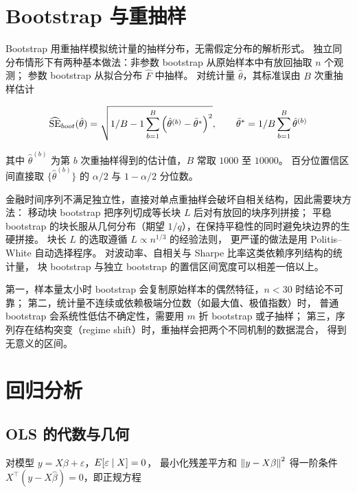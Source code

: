 \section{Bootstrap 与重抽样}

Bootstrap 用重抽样模拟统计量的抽样分布，无需假定分布的解析形式。
独立同分布情形下有两种基本做法：非参数 bootstrap 从原始样本中有放回抽取 $n$ 个观测；
参数 bootstrap 从拟合分布 $\hat{F}$ 中抽样。
对统计量 $\hat{\theta}$，其标准误由 $B$ 次重抽样估计

\begin{equation}
  \widehat{\operatorname{SE}}_{boot}(\hat{\theta}) =
  \sqrt{1/B-1\sum_{b=1}^{B}\left(\hat{\theta}^{(b)} - \bar{\theta}^{*}\right)^{2}},
  \qquad \bar{\theta}^{*} = 1/B\sum_{b=1}^{B}\hat{\theta}^{(b)}
  \label{eq:08-bootse}
\end{equation}

其中 $\hat{\theta}^{(b)}$ 为第 $b$ 次重抽样得到的估计值，$B$ 常取 $1000$ 至 $10000$。
百分位置信区间直接取 $\{\hat{\theta}^{(b)}\}$ 的 $\alpha/2$ 与 $1-\alpha/2$ 分位数。

金融时间序列不满足独立性，直接对单点重抽样会破坏自相关结构，因此需要块方法：
移动块 bootstrap 把序列切成等长块 $L$ 后对有放回的块序列拼接；
平稳 bootstrap 的块长服从几何分布（期望 $1/q$），在保持平稳性的同时避免块边界的生硬拼接。
块长 $L$ 的选取遵循 $L \propto n^{1/3}$ 的经验法则，
更严谨的做法是用 Politis--White 自动选择程序。
对波动率、自相关与 Sharpe 比率这类依赖序列结构的统计量，
块 bootstrap 与独立 bootstrap 的置信区间宽度可以相差一倍以上。

\begin{notebox}
第一，样本量太小时 bootstrap 会复制原始样本的偶然特征，$n < 30$ 时结论不可靠；
第二，统计量不连续或依赖极端分位数（如最大值、极值指数）时，
普通 bootstrap 会系统性低估不确定性，需要用 $m$ 折 bootstrap 或子抽样；
第三，序列存在结构突变（regime shift）时，重抽样会把两个不同机制的数据混合，
得到无意义的区间。
\end{notebox}

\section{回归分析}

\subsection{OLS 的代数与几何}

对模型 $y = X\beta + \varepsilon$，$E[\varepsilon \mid X] = 0$，
最小化残差平方和 $\left\lVert y - X\beta \right\rVert^{2}$ 得一阶条件 $X^{\top}(y - X\hat{\beta}) = 0$，即正规方程

